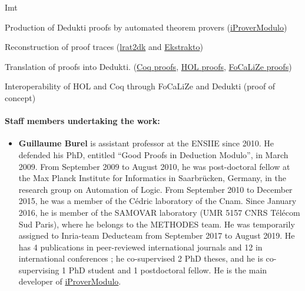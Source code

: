 \begin{sitedescription}{Imt}
\begin{compactitem}
\item Production of Dedukti proofs by automated theorem provers (\href{http://www.ensiie.fr/~guillaume.burel/blackandwhite_iProverModulo.html.en}{iProverModulo})
\item Reconstruction of proof traces
  (\href{https://github.com/gburel/lrat2dk}{lrat2dk} and \href{https://github.com/Deducteam/ekstrakto}{Ekstrakto})
\item Translation of proofs into Dedukti. (\href{http://www.ensiie.fr/~guillaume.burel/blackandwhite_coqInE.html.en}{Coq
  proofs}, \href{http://deducteam.gforge.inria.fr/holide/}{HOL
  proofs}, \href{http://deducteam.gforge.inria.fr/focalide/}{FoCaLiZe proofs})
  \item Interoperability of HOL and Coq through FoCaLiZe and Dedukti (proof of concept)
\end{compactitem}

\paragraph{Staff members undertaking the work:}

\begin{itemize} %

\item{\bf Guillaume Burel}
 is
assistant professor at the ENSIIE since 2010. He defended his PhD,
entitled ``Good Proofs in Deduction Modulo'', in March 2009. From
September 2009 to August 2010, he was post-doctoral fellow at the Max
Planck Institute for Informatics in Saarbrücken, Germany, in the
research group on Automation of Logic. From September 2010 to December
2015, he was a member of the Cédric laboratory of the Cnam. Since
January 2016, he is member of the SAMOVAR laboratory (UMR 5157 CNRS
Télécom Sud Paris), where he belongs to the METHODES team. He was
temporarily assigned to Inria-team Deducteam from September 2017 to
August 2019.  He has 4
publications in peer-reviewed international journals and 12 in
international conferences ; he co-supervised 2 PhD theses, and he is
co-supervising 1 PhD student and 1 postdoctoral fellow. He is the
main developer of
\href{http://www.ensiie.fr/~guillaume.burel/blackandwhite_iProverModulo.html.en}{iProverModulo}.


\end{itemize}
\end{sitedescription}
